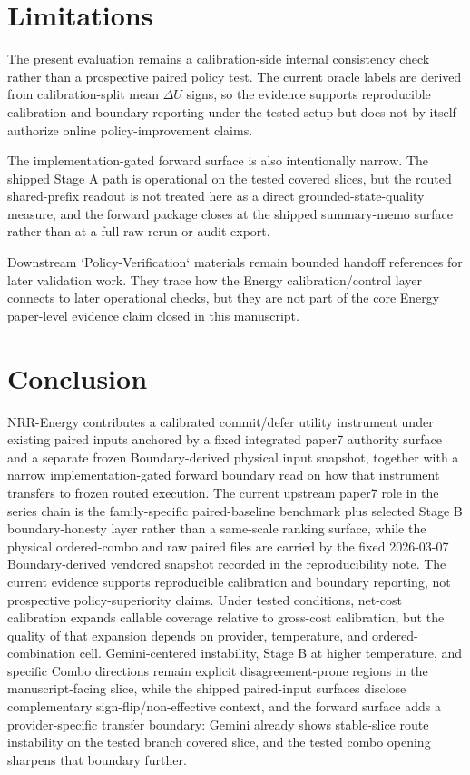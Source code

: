 \documentclass[11pt,a4paper]{article}
\begin{document}
\section{Limitations}
\label{sec:limitations}

The present evaluation remains a calibration-side internal consistency check
rather than a prospective paired policy test. The current oracle labels are
derived from calibration-split mean $\Delta U$ signs, so the evidence supports
reproducible calibration and boundary reporting under the tested setup but does
not by itself authorize online policy-improvement claims.

The implementation-gated forward surface is also intentionally narrow. The
shipped Stage A path is operational on the tested covered slices, but the
routed shared-prefix readout is not treated here as a direct grounded-state-quality
measure, and the forward package closes at the shipped summary-memo surface
rather than at a full raw rerun or audit export.

Downstream `Policy-Verification` materials remain bounded handoff references for
later validation work. They trace how the Energy calibration/control layer
connects to later operational checks, but they are not part of the core Energy
paper-level evidence claim closed in this manuscript.

\section{Conclusion}
\label{sec:conclusion}

NRR-Energy contributes a calibrated commit/defer utility instrument under existing paired inputs anchored by a fixed integrated paper7 authority surface and a separate frozen Boundary-derived physical input snapshot, together with a narrow implementation-gated forward boundary read on how that instrument transfers to frozen routed execution. The current upstream paper7 role in the series chain is the family-specific paired-baseline benchmark plus selected Stage B boundary-honesty layer rather than a same-scale ranking surface, while the physical ordered-combo and raw paired files are carried by the fixed 2026-03-07 Boundary-derived vendored snapshot recorded in the reproducibility note. The current evidence supports reproducible calibration and boundary reporting, not prospective policy-superiority claims. Under tested conditions, net-cost calibration expands callable coverage relative to gross-cost calibration, but the quality of that expansion depends on provider, temperature, and ordered-combination cell. Gemini-centered instability, Stage B at higher temperature, and specific Combo directions remain explicit disagreement-prone regions in the manuscript-facing slice, while the shipped paired-input surfaces disclose complementary sign-flip/non-effective context, and the forward surface adds a provider-specific transfer boundary: Gemini already shows stable-slice route instability on the tested branch covered slice, and the tested combo opening sharpens that boundary further.
\end{document}
